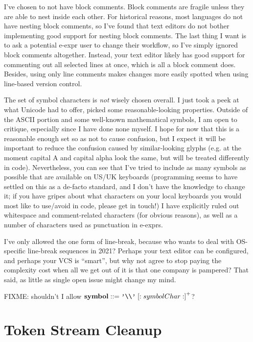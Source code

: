 \documentclass[11pt]{article} %
\begin{document}
I've chosen to not have block comments.
Block comments are fragile unless they are able to nest inside each other.
For historical reasons, most languages do not have nesting block comments, so I've found that text editors do not bother implementing good support for nesting block comments.
The last thing I want is to ask a potential e-expr user to change their workflow, so I've simply ignored block comments altogether.
Instead, your text editor likely has good support for commenting out all selected lines at once, which is all a block comment does.
Besides, using only line comments makes changes more easily spotted when using line-based version control.

The set of symbol characters is \emph{not} wisely chosen overall.
I just took a peek at what Unicode had to offer, picked some reasonable-looking properties.
Outside of the ASCII portion and some well-known mathematical symbols, I am open to critique, especially since I have done none myself.
I hope for now that this is a reasonable enough set so as not to cause confusion, but I expect it will be important to reduce the confusion caused by similar-looking glyphs (e.g. at the moment capital A and capital alpha look the same, but will be treated differently in code).
Nevertheless, you can see that I've tried to include as many symbols as possible that are available on US/UK keyboards (programming seems to have settled on this as a de-facto standard, and I don't have the knowledge to change it; if you have gripes about what characters on your local keyboards you would most like to use/avoid in code, please get in touch!)
I have explicitly ruled out whitespace and comment-related characters (for obvious reasons), as well as a number of characters used as punctuation in e-exprs.


I've only allowed the one form of line-break, because who wants to deal with OS-specific line-break sequences in 2021?
Perhaps your text editor can be configured, and perhaps your VCS is ``smart'', but why not agree to stop paying the complexity cost when all we get out of it is that one company is pampered?
That said, as little as single open issue might change my mind.


FIXME: shouldn't I allow $\mathbf{symbol} ::= \texttt{'{\textbackslash\textbackslash}'}\;\mathopen{[\mathord:\;} symbolChar \mathclose{\;\mathord:]}^+$?

\section{Token Stream Cleanup}
\end{document}
